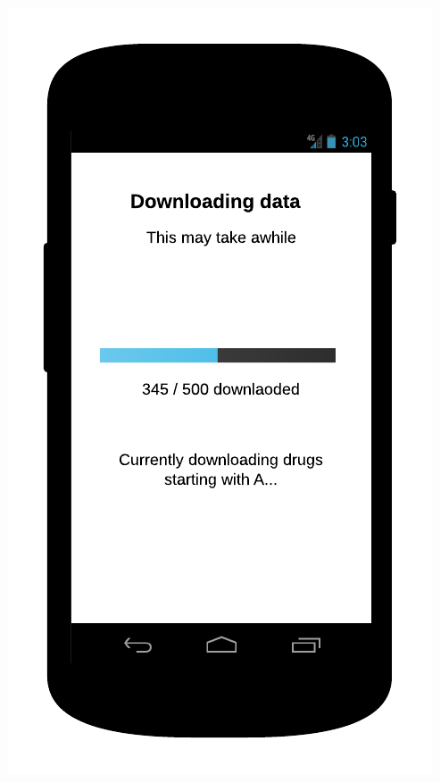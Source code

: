 \begin{description}
\begin{figure}
\begin{minipage}{.5\textwidth}
  \includegraphics[width=.7\linewidth]{Images/mockups/download.png}
\end{minipage}
\end{figure}


\end{description}
